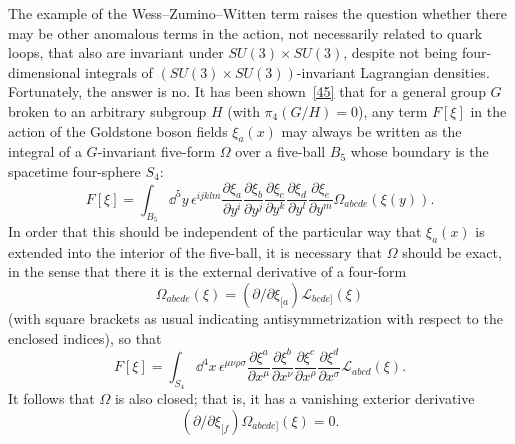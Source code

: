 The example of the Wess--Zumino--Witten term raises the question whether there may be other anomalous terms in the action, not necessarily related to quark loops, that also are invariant under $SU(3)\times SU(3)$, despite not being four-dimensional integrals of $(SU(3)\times SU(3))$-invariant Lagrangian densities. Fortunately, the answer is no. It has been shown~\hyperref[ch19-ref-45]{[45]} that for a general group $G$ broken to an arbitrary subgroup $H$ (with $\pi_4(G/H)=0$), any term $F[\xi]$ in the action of the Goldstone boson fields $\xi_a(x)$ may always be written as the integral of a $G$-invariant five-form $\Omega$ over a five-ball $B_5$ whose boundary is the spacetime four-sphere $S_4$:
\begin{equation}
F[\xi]
=\int_{B_5}\dd^5y\,\epsilon^{ijklm}
\frac{\partial\xi_a}{\partial y^i}
\frac{\partial\xi_b}{\partial y^j}
\frac{\partial\xi_c}{\partial y^k}
\frac{\partial\xi_d}{\partial y^l}
\frac{\partial\xi_e}{\partial y^m}
\Omega_{abcde}(\xi(y)).
\tag{19.8.8}\label{eq:19.8.8}
\end{equation}
In order that this should be independent of the particular way that $\xi_a(x)$ is extended into the interior of the five-ball, it is necessary that $\Omega$ should be exact, in the sense that there it is the external derivative of a four-form
\begin{equation}
\Omega_{abcde}(\xi)
=\left(\partial/\partial\xi_{[a}\right)\mathcal L_{bcde]}(\xi)
\tag{19.8.9}\label{eq:19.8.9}
\end{equation}
(with square brackets as usual indicating antisymmetrization with respect to the enclosed indices), so that
\begin{equation}
F[\xi]
=\int_{S_4}\dd^4x\,\epsilon^{\mu\nu\rho\sigma}
\frac{\partial\xi^a}{\partial x^\mu}
\frac{\partial\xi^b}{\partial x^\nu}
\frac{\partial\xi^c}{\partial x^\rho}
\frac{\partial\xi^d}{\partial x^\sigma}
\mathcal L_{abcd}(\xi).
\tag{19.8.10}\label{eq:19.8.10}
\end{equation}
It follows that $\Omega$ is also closed; that is, it has a vanishing exterior derivative
\begin{equation}
\left(\partial/\partial\xi_{[f}\right)
\Omega_{abcde]}(\xi)=0.
\tag{19.8.11}\label{eq:19.8.11}
\end{equation}
